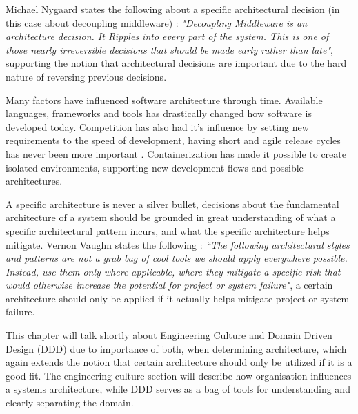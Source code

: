 Michael Nygaard states the following about a specific architectural decision (in this case about decoupling middleware) \cite[p.~116]{nygard2007release}: \textit{"Decoupling Middleware is an architecture decision. It Ripples into every part of the system. This is one of those nearly irreversible decisions that should be made early rather than late"}, supporting the notion that architectural decisions are important due to the hard nature of reversing previous decisions.

Many factors have influenced software architecture through time. Available languages, frameworks and tools has drastically changed how software is developed today. Competition has also had it's influence by setting new requirements to the speed of development, having short and agile release cycles has never been more important \cite[t.~06:55]{george2016it}. Containerization has made it possible to create isolated environments, supporting new development flows and possible architectures.

A specific architecture is never a silver bullet, decisions about the fundamental architecture of a system should be grounded in great understanding of what a specific architectural pattern incurs, and what the specific architecture helps mitigate. Vernon Vaughn states the following \cite[p.~113]{vernon2013implementing}: \textit{“The following architectural styles and patterns are not a grab bag of cool tools we should apply everywhere possible. Instead, use them only where applicable, where they mitigate a specific risk that would otherwise increase the potential for project or system failure"}, a certain architecture should only be applied if it actually helps mitigate project or system failure.

This chapter will talk shortly about Engineering Culture and Domain Driven Design (DDD) due to importance of both, when determining architecture, which again extends the notion that certain architecture should only be utilized if it is a good fit. The engineering culture section will describe how organisation influences a systems architecture, while DDD serves as a bag of tools for understanding and clearly separating the domain.

